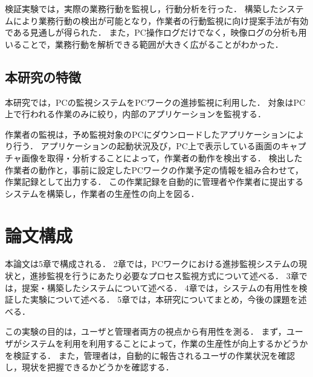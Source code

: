 検証実験では，実際の業務行動を監視し，行動分析を行った．
構築したシステムにより業務行動の検出が可能となり，作業者の行動監視に向け提案手法が有効である見通しが得られた．
また，PC操作ログだけでなく，映像ログの分析も用いることで，業務行動を解析できる範囲が大きく広がることがわかった．

\subsection{本研究の特徴}
本研究では，PCの監視システムをPCワークの進捗監視に利用した．
対象はPC上で行われる作業のみに絞り，内部のアプリケーションを監視する．

作業者の監視は，予め監視対象のPCにダウンロードしたアプリケーションにより行う．
アプリケーションの起動状況及び，PC上で表示している画面のキャプチャ画像を取得・分析することによって，作業者の動作を検出する．
検出した作業者の動作と，事前に設定したPCワークの作業予定の情報を組み合わせて，作業記録として出力する．
この作業記録を自動的に管理者や作業者に提出するシステムを構築し，作業者の生産性の向上を図る．

\section{論文構成}
本論文は5章で構成される．
2章では，PCワークにおける進捗監視システムの現状と，進捗監視を行うにあたり必要なプロセス監視方式について述べる．
3章では，提案・構築したシステムについて述べる．
4章では，システムの有用性を検証した実験について述べる．
5章では，本研究についてまとめ，今後の課題を述べる．



この実験の目的は，ユーザと管理者両方の視点から有用性を測る．
まず，ユーザがシステムを利用を利用することによって，作業の生産性が向上するかどうかを検証する．
また，管理者は，自動的に報告されるユーザの作業状況を確認し，現状を把握できるかどうかを確認する．
